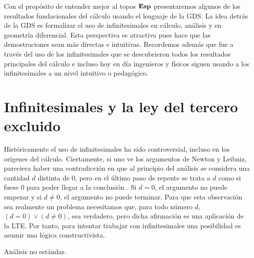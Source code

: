 Con el propósito de entender mejor al topos $\mathbf{Esp}$ presentaremos algunos de los resultados
fundacionales del cálculo usando el lenguaje de la GDS. La idea detrás de la GDS es formalizar
el uso de infinitesimales en cálculo, análisis y en geometría diferencial. Esta perspectiva
es atractiva pues hace que las demostraciones sean más directas e intuitivas. Recordemos además
que fue a través del uso de los infinitesimales que se descubrieron todos los resultados
principales del cálculo \cite{dunham2018calculus} e incluso hoy en día ingenieros y físicos siguen usando a los infinitesimales
a un nivel intuitivo o pedagógico.

\section{Infinitesimales y la ley del tercero excluido}
Históricamente el uso de infinitesimales ha sido controversial, incluso en los orígenes
del cálculo. Ciertamente, si uno ve los argumentos de Newton y Leibniz, pareciera haber
una contradicción en que al principio del análisis se considera una cantidad $d$ distinta de $0$,
pero en el último paso de repente se trata a $d$ como si fuese $0$ para poder llegar a la
conclusión \cite{dunham2018calculus}. Si $d=0$, el argumento no puede empezar y si $d \not = 0$, el argumento no
puede terminar. Para que esta observación sea realmente un problema necesitamos que, para
todo número $d$, $(d=0) \lor (d \not = 0)$, sea verdadero, pero dicha afirmación es una
aplicación de la LTE. Por tanto, para intentar trabajar con infinitesimales una posibilidad
es asumir una lógica constructivista.

Análisis no estándar.

